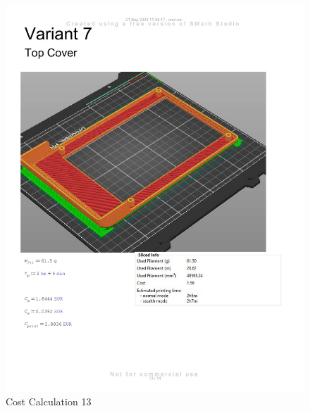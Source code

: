 \begin{figure}[H]
    \centering
    \includegraphics[width=\linewidth]{texs/appendix/data/cost1-13.jpg}
    \caption{Cost Calculation 13}
    \label{fig:cost-calculation-13}
\end{figure}

